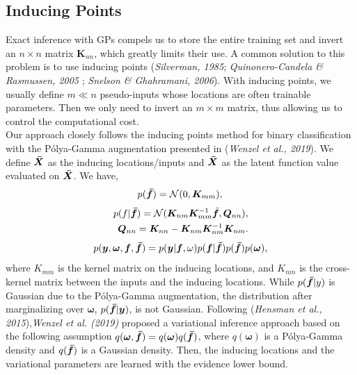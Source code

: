 \documentclass[preprint,11pt]{elsarticle}
\begin{document}
    \subsection{Inducing Points}
    \label{sec:2.4}
        Exact inference with GPs compels us to store the entire
        training set and invert an $n \times n$ matrix $\bm{K}_{nn}$, which greatly
        limits their use. A common solution to this problem is to
        use inducing points (\textit{Silverman, 1985}\cite{silverman1985some}; \textit{Quinonero-Candela \& Rasmussen, 2005}
        \cite{quinonero2005unifying}; \textit{Snelson \& Ghahramani, 2006}\cite{snelson2006sparse}). With
        inducing points, we usually define $m \ll n $ pseudo-inputs
        whose locations are often trainable parameters. Then we
        only need to invert an $m \times m$ matrix, thus allowing us to
        control the computational cost.
        \\
        Our approach closely follows the inducing points method for
        binary classification with the Pólya-Gamma augmentation
        presented in (\textit{Wenzel et al., 2019}\cite{wenzel2019efficient}). We define $\bm{\Bar{X}}$
        as the
        inducing locations/inputs and $\bm{\Bar{X}}$ as the latent function value
        evaluated on $\bm{\Bar{X}}$. We have,
        \begin{equation}
            p(\bm{\Bar{f}}) = \mathcal{N}( 0,\bm{K}_{mm} ),\\
        \end{equation}
        \begin{equation}
            \begin{split}
                p(f|\bm{\Bar{f}}) = \mathcal{N}( \bm{K}_{nm}{\bm{K}}_{mm}^{-1}\Bar{\bm{f}},\bm{Q}_{nn} ),\\
                \bm{Q}_{nn} = \bm{K}_{nn} - \bm{K}_{nm}\bm{K}_{nm}^{-1}\bm{K}_{nm}.
            \end{split}
        \end{equation}
        \begin{equation}
            p( \bm{y},\bm{\omega},\bm{f},\bm{\Bar{f}} ) = p( \bm{y}|\bm{f},\omega )p( \bm{f}|\bm{\Bar{f}} )p( \bm{\Bar{f}} )p(\bm{\omega}),
        \end{equation}
        where $K_{mm}$ is the kernel matrix on the inducing locations,
        and $K_{nm}$ is the cross-kernel matrix between the inputs and
        the inducing locations. While $p(\bm{\Bar{f}}|y)$ is Gaussian due
        to the Pólya-Gamma augmentation, the distribution after
        marginalizing over $\bm{\omega}$, $p( \bm{\Bar{f}}|\bm{y} )$, is not Gaussian. Following
        (\textit{Hensman et al., 2015}\cite{hensman2015scalable}),\textit{Wenzel et al. (2019)}\cite{wenzel2019efficient} proposed a variational
        inference approach based on the following assumption
        $q(\bm{\omega}, \bm{\Bar{f}}) = q(\bm{\omega})q(\bm{\Bar{f}})$, where $q(\bm{\omega})$ is a Pólya-Gamma
        density and $q(\bm{\Bar{f}})$ is a Gaussian density. Then, the inducing
        locations and the variational parameters are learned with the
        evidence lower bound.
            
\end{document}
